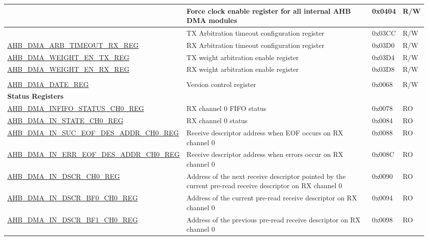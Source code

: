 \begin{longtable}{ | l | p{10cm} | p{1.3cm} | l | }
{    \hyperref[regdesc:AHBDMAMODULECLKENREG]{AHB\_DMA\_MODULE\_CLK\_EN\_REG} & Force clock enable register for all internal AHB DMA modules & 0x0404 & R/W \\ \hline
}{
    \hyperref[regdesc:AHBDMAARBTIMEOUTTXREG]{AHB\_DMA\_ARB\_TIMEOUT\_TX\_REG} & TX Arbitration timeout configuration register & 0x03CC & R/W \\ \hline
    \hyperref[regdesc:AHBDMAARBTIMEOUTRXREG]{AHB\_DMA\_ARB\_TIMEOUT\_RX\_REG} & RX Arbitration timeout configuration register & 0x03D0 & R/W \\ \hline
    \hyperref[regdesc:AHBDMAWEIGHTENTXREG]{AHB\_DMA\_WEIGHT\_EN\_TX\_REG} & TX weight arbitration enable register & 0x03D4 & R/W \\ \hline
    \hyperref[regdesc:AHBDMAWEIGHTENRXREG]{AHB\_DMA\_WEIGHT\_EN\_RX\_REG} & RX weight arbitration enable register & 0x03D8 & R/W \\ \hline
}
\multicolumn{4}{|l|}{\textbf{Version Register}} \\ \hline
\hyperref[regdesc:AHBDMADATEREG]{AHB\_DMA\_DATE\_REG} & Version control register & 0x0068 & R/W \\ \hline
\multicolumn{4}{|l|}{\textbf{Status Registers}} \\ \hline
\hyperref[regdesc:AHBDMAINFIFOSTATUSCHNREG]{AHB\_DMA\_INFIFO\_STATUS\_CH0\_REG} & RX channel 0 FIFO status & 0x0078 & RO \\ \hline
\hyperref[regdesc:AHBDMAINSTATECHNREG]{AHB\_DMA\_IN\_STATE\_CH0\_REG} & RX channel 0 status & 0x0084 & RO \\ \hline
\hyperref[regdesc:AHBDMAINSUCEOFDESADDRCHNREG]{AHB\_DMA\_IN\_SUC\_EOF\_DES\_ADDR\_CH0\_REG} & Receive descriptor address when EOF
occurs on RX channel 0 & 0x0088 & RO \\ \hline
\hyperref[regdesc:AHBDMAINERREOFDESADDRCHNREG]{AHB\_DMA\_IN\_ERR\_EOF\_DES\_ADDR\_CH0\_REG} & Receive descriptor address when errors
occur on RX channel 0 & 0x008C & RO \\ \hline
\hyperref[regdesc:AHBDMAINDSCRCHNREG]{AHB\_DMA\_IN\_DSCR\_CH0\_REG} & Address of the next receive descriptor pointed by the current pre-read receive descriptor on RX channel 0 & 0x0090 & RO \\ \hline
\hyperref[regdesc:AHBDMAINDSCRBF0CHNREG]{AHB\_DMA\_IN\_DSCR\_BF0\_CH0\_REG} & Address of the current pre-read receive descriptor on RX channel 0 & 0x0094 & RO \\ \hline
\hyperref[regdesc:AHBDMAINDSCRBF1CHNREG]{AHB\_DMA\_IN\_DSCR\_BF1\_CH0\_REG} & Address of the previous pre-read receive descriptor on RX channel 0 & 0x0098 & RO \\ \hline

\end{longtable}
